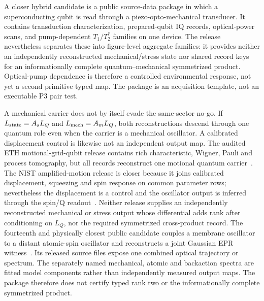 \documentclass[11pt]{article}
\begin{document}
A closer hybrid candidate is a public source-data package in which a
superconducting qubit is read through a piezo-opto-mechanical transducer.  It contains transduction
characterization, prepared-qubit IQ records, optical-power scans, and
pump-dependent $T_1/T_2^*$ families on one device.  The release nevertheless
separates these into figure-level aggregate families: it provides neither an
independently reconstructed mechanical/stress state nor shared record keys
for an informationally complete quantum--mechanical symmetrized product.
Optical-pump dependence is therefore a controlled environmental response, not
yet a second primitive typed map.  The package is an acquisition template,
not an executable P3 pair test.

A mechanical carrier does not by itself evade the same-sector no-go.  If
$L_{\rm state}=A_sL_Q$ and $L_{\rm mech}=A_mL_Q$, both reconstructions descend
through one quantum role even when the carrier is a mechanical oscillator.  A
calibrated displacement control is likewise not an independent output map.
The audited ETH motional-grid-qubit release contains rich characteristic,
Wigner, Pauli and process tomography, but all records reconstruct one motional
quantum carrier~\cite{Fluehmann2019}.  The NIST amplified-motion release is closer because it joins
calibrated displacement, squeezing and spin response on common parameter rows;
nevertheless the displacement is a control and the oscillator output is
inferred through the spin/Q readout~\cite{Burd2019}.  Neither release supplies an independently
reconstructed mechanical or stress output whose differential adds rank after
conditioning on $L_Q$, nor the required symmetrized cross-product record.
The fourteenth and physically closest public candidate couples a membrane
oscillator to a distant atomic-spin oscillator and reconstructs a joint
Gaussian EPR witness~\cite{Thomas2021}.  Its released source files expose one
combined optical trajectory or spectrum.  The separately named mechanical,
atomic and backaction spectra are fitted model components rather than
independently measured output maps.  The package therefore does not certify
typed rank two or the informationally complete symmetrized product.
\end{document}
